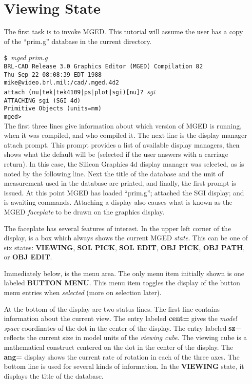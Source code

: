 \section{Viewing State}

The first task is to invoke MGED.  This tutorial will assume the user
has a copy of the ``prim.g'' database in the current directory.

\noindent
{\tt \$ }{\em mged prim.g}\\
{\tt BRL-CAD Release 3.0 Graphics Editor (MGED) Compilation 82}\\
{\tt Thu Sep 22 08:08:39 EDT 1988}\\
{\tt mike@video.brl.mil:/cad/.mged.4d2}\\

\noindent
{\tt attach (nu|tek|tek4109|ps|plot|sgi)[nu]? }{\em sgi}\\
{\tt ATTACHING sgi (SGI 4d)}\\
{\tt Primitive Objects (units=mm)}\\
{\tt mged> }\\

The first three lines give information about which version of MGED is running,
when it was compiled, and who compiled it.  The next line is the display
manager attach prompt.  This prompt provides a list of available display
managers, then shows what the default will be (selected if the user answers
with a carriage return).  In this case, the Silicon Graphics 4d display
manager was selected, as is noted by the following line.
Next the title of the database and
the unit of measurement used in the database are printed,
and finally, the first prompt is issued.
At this point MGED has loaded ``prim.g''; attached the SGI display;
and is awaiting commands.  Attaching a display also causes what
is known as the MGED {\sl faceplate} to be drawn on the graphics display.

The faceplate has several features of interest.  In the upper left corner
of the display, is a box which always shows the current MGED {\sl state}.
This can be one of six states:  {\bf VIEWING}, {\bf SOL PICK},
{\bf SOL EDIT}, {\bf OBJ PICK}, {\bf OBJ PATH}, or {\bf OBJ EDIT}.

Immediately below, is the menu area.  The only menu item initially shown is
one labeled {\bf BUTTON MENU}.  This menu item toggles the display of the
button menu entries when {\sl selected} (more on selection later).

At the bottom of the display are two status lines.  The first line
contains information about the current view.
The entry labeled {\bf cent=} gives the {\sl model space} coordinates
of the dot in the center of the display.
The entry labeled {\bf sz=} reflects the current size in model units of
the {\sl viewing cube}.  The viewing cube is a mathematical construct
centered on the dot in the center of the display.  The {\bf ang=}
display shows the current rate of rotation in each of the three axes.
The bottom line is used for several kinds of information.
In the {\bf VIEWING} state, it displays the title of the database.

